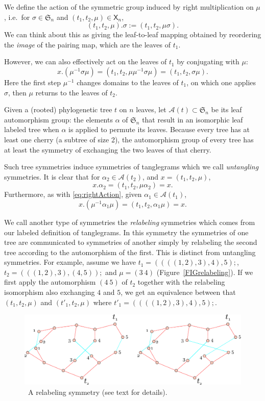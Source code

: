 \documentclass{amsart}
\newcommand{\fS}{\mathfrak S}
\newcommand{\aut}{\mathcal A}
\newcommand{\pairing}{\mu}
\newcommand{\tangle}{\mathsf{X}}
\newcommand{\arxiv}[1]{#1}
\newcommand{\FIGrelabeling}{\
\label{FIGrelabeling}
\begin{figure}
  \arxiv{\includegraphics[width=5in]{figures/relabeling-example}}
\caption{\
  A relabeling symmetry (see text for details).
}
\end{figure}
}
\begin{document}
We define the action of the symmetric group induced by right multiplication on $\pairing$, i.e.\ for $\sigma \in \fS_n$ and $(t_1, t_2, \pairing) \in \tangle_n$,
\[
(t_1, t_2, \pairing) . \sigma := (t_1, t_2, \pairing \sigma).
\]
We can think about this as giving the leaf-to-leaf mapping obtained by reordering the \emph{image} of the pairing map, which are the leaves of $t_1$.

However, we can also effectively act on the leaves of $t_1$ by conjugating with $\pairing$:
\begin{equation}
\label{eq:rightAction}
x . (\pairing^{-1} \sigma \pairing)
= (t_1, t_2, \pairing \pairing^{-1} \sigma \pairing)
= (t_1, t_2, \sigma \pairing).
\end{equation}
Here the first step $\pairing^{-1}$ changes domains to the leaves of $t_1$, on which one applies $\sigma$, then $\pairing$ returns to the leaves of $t_2$.

Given a (rooted) phylogenetic tree $t$ on $n$ leaves, let $\aut(t) \subset \fS_n$ be its leaf automorphism group: the elements $\alpha$ of $\fS_n$ that result in an isomorphic leaf labeled tree when $\alpha$ is applied to permute its leaves.
Because every tree has at least one cherry (a subtree of size 2), the automorphism group of every tree has at least the symmetry of exchanging the two leaves of that cherry.

Such tree symmetries induce symmetries of tanglegrams which we call \emph{untangling} symmetries.
It is clear that for $\alpha_2 \in \aut(t_2)$, and $x = (t_1, t_2, \pairing)$,
\[
x . \alpha_2 = (t_1, t_2, \pairing \alpha_2) = x.
\]
Furthermore, as with \eqref{eq:rightAction}, given $\alpha_1 \in \aut(t_1)$,
\[
x . (\pairing^{-1} \alpha_1 \pairing) = (t_1, t_2, \alpha_1 \pairing) = x.
\]

We call another type of symmetries the \emph{relabeling} symmetries which comes from our labeled definition of tanglegrams.
In this symmetry the symmetries of one tree are communicated to symmetries of another simply by relabeling the second tree according to the automorphism of the first.
This is distinct from untangling symmetries.
For example, assume we have $t_1 = ((((1,2),3),4),5);$, $t_2 = (((1,2),3),(4,5));$ and $\mu = (3\ 4)$ (Figure~\ref{FIGrelabeling}).
If we first apply the automorphism $(4\ 5)$ of $t_2$ together with the relabeling isomorphism also exchanging $4$ and $5$, we get an equivalence between that $(t_1,t_2,\pairing)$ and $(t'_1,t_2,\pairing)$ where $t'_1 = ((((1,2),3),4),5);$.
\FIGrelabeling
\end{document}
